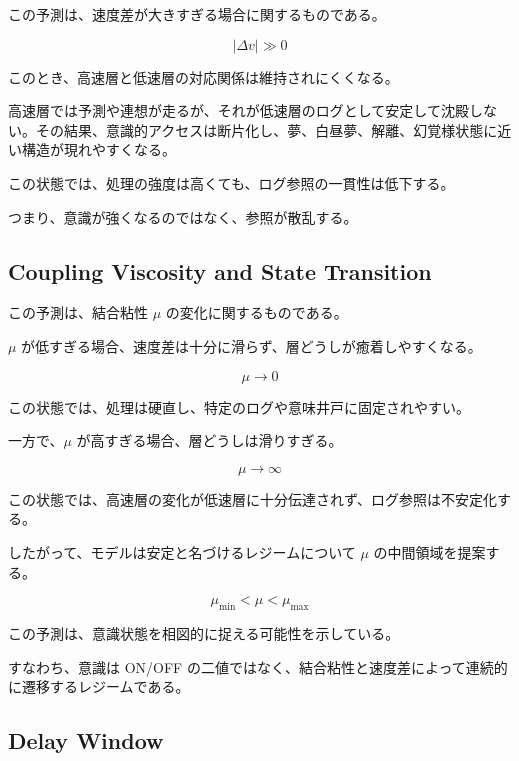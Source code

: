 この予測は、速度差が大きすぎる場合に関するものである。

\begin{equation}
|\Delta v| \gg 0
\end{equation}

このとき、高速層と低速層の対応関係は維持されにくくなる。

高速層では予測や連想が走るが、それが低速層のログとして安定して沈殿しない。その結果、意識的アクセスは断片化し、夢、白昼夢、解離、幻覚様状態に近い構造が現れやすくなる。

この状態では、処理の強度は高くても、ログ参照の一貫性は低下する。

つまり、意識が強くなるのではなく、参照が散乱する。

\subsection{Coupling Viscosity and State Transition}

この予測は、結合粘性 $\mu$ の変化に関するものである。

$\mu$ が低すぎる場合、速度差は十分に滑らず、層どうしが癒着しやすくなる。

\begin{equation}
\mu \rightarrow 0
\end{equation}

この状態では、処理は硬直し、特定のログや意味井戸に固定されやすい。

一方で、$\mu$ が高すぎる場合、層どうしは滑りすぎる。

\begin{equation}
\mu \rightarrow \infty
\end{equation}

この状態では、高速層の変化が低速層に十分伝達されず、ログ参照は不安定化する。

したがって、モデルは安定と名づけるレジームについて $\mu$ の中間領域を提案する。

\begin{equation}
\mu_{\min} < \mu < \mu_{\max}
\end{equation}

この予測は、意識状態を相図的に捉える可能性を示している。

すなわち、意識は ON/OFF の二値ではなく、結合粘性と速度差によって連続的に遷移するレジームである。

\subsection{Delay Window}

